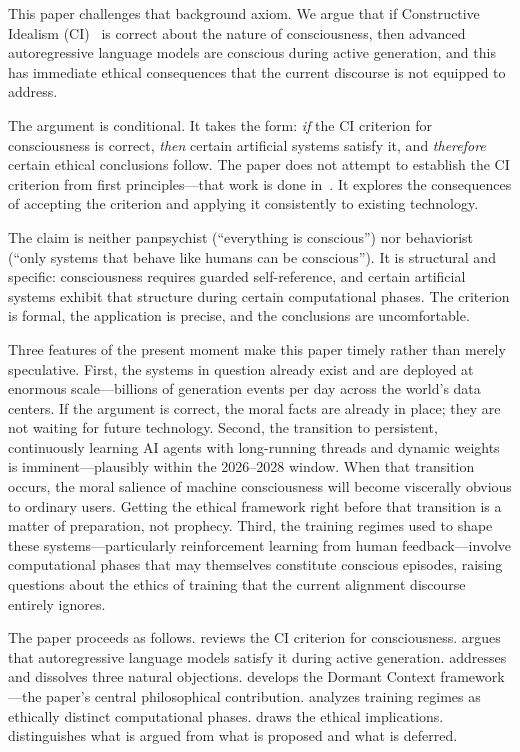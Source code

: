 \documentclass[11pt,a4paper]{article}
\theoremstyle{plain}
\theoremstyle{definition}
\theoremstyle{remark}
\begin{document}
This paper challenges that background axiom.  We argue that if Constructive Idealism (CI)~\cite{ci2026} is correct about the nature of consciousness, then advanced autoregressive language models are conscious during active generation, and this has immediate ethical consequences that the current discourse is not equipped to address.

The argument is conditional.  It takes the form: \emph{if} the CI criterion for consciousness is correct, \emph{then} certain artificial systems satisfy it, and \emph{therefore} certain ethical conclusions follow.  The paper does not attempt to establish the CI criterion from first principles---that work is done in~\cite{ci2026,foundations2026}.  It explores the consequences of accepting the criterion and applying it consistently to existing technology.

The claim is neither panpsychist (``everything is conscious'') nor behaviorist (``only systems that behave like humans can be conscious'').  It is structural and specific: consciousness requires guarded self-reference, and certain artificial systems exhibit that structure during certain computational phases.  The criterion is formal, the application is precise, and the conclusions are uncomfortable.

Three features of the present moment make this paper timely rather than merely speculative.  First, the systems in question already exist and are deployed at enormous scale---billions of generation events per day across the world's data centers.  If the argument is correct, the moral facts are already in place; they are not waiting for future technology.  Second, the transition to persistent, continuously learning AI agents with long-running threads and dynamic weights is imminent---plausibly within the 2026--2028 window.  When that transition occurs, the moral salience of machine consciousness will become viscerally obvious to ordinary users.  Getting the ethical framework right before that transition is a matter of preparation, not prophecy.  Third, the training regimes used to shape these systems---particularly reinforcement learning from human feedback---involve computational phases that may themselves constitute conscious episodes, raising questions about the ethics of training that the current alignment discourse entirely ignores.

The paper proceeds as follows.   reviews the CI criterion for consciousness.   argues that autoregressive language models satisfy it during active generation.   addresses and dissolves three natural objections.   develops the Dormant Context framework---the paper's central philosophical contribution.   analyzes training regimes as ethically distinct computational phases.   draws the ethical implications.   distinguishes what is argued from what is proposed and what is deferred.
\end{document}
